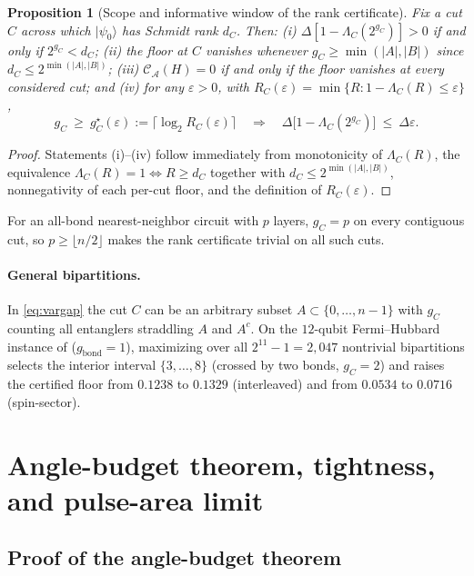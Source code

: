 \documentclass[reprint,aps,pra,floatfix,superscriptaddress,nofootinbib,longbibliography]{revtex4-2}
\newtheorem{proposition}[theorem]{Proposition}
\theoremstyle{remark}
\theoremstyle{definition}
\newcommand{\calA}{\mathcal{A}}
\newcommand{\calC}{\mathcal{C}}
\newcommand{\ket}[1]{\lvert #1 \rangle}
\begin{document}
\begin{proposition}[Scope and informative window of the rank certificate]
\label{prop:window}
Fix a cut $C$ across which $\ket{\psi_0}$ has Schmidt rank $d_C$. Then:
(i) $\Delta[1-\Lambda_C(2^{g_C})]>0$ if and only if $2^{g_C}<d_C$;
(ii) the floor at $C$ vanishes whenever $g_C\ge\min(|A|,|B|)$ since
$d_C\le2^{\min(|A|,|B|)}$;
(iii) $\calC_\calA(H)=0$ if and only if the floor vanishes at every considered
cut; and
(iv) for any $\varepsilon>0$, with $R_C(\varepsilon)=\min\{R:1-\Lambda_C(R)\le\varepsilon\}$,
\begin{equation}
  g_C\ \ge\ g_C^\star(\varepsilon):=\bigl\lceil\log_2 R_C(\varepsilon)\bigr\rceil
  \quad\Longrightarrow\quad
  \Delta\bigl[1-\Lambda_C(2^{g_C})\bigr]\ \le\ \Delta\varepsilon .
\end{equation}
\end{proposition}

\begin{proof}
Statements (i)--(iv) follow immediately from monotonicity of $\Lambda_C(R)$, the
equivalence $\Lambda_C(R)=1\iff R\ge d_C$ together with
$d_C\le2^{\min(|A|,|B|)}$, nonnegativity of each
per-cut floor, and the definition of $R_C(\varepsilon)$.
\end{proof}

For an all-bond nearest-neighbor circuit with $p$ layers, $g_C=p$ on every
contiguous cut, so $p\ge\lfloor n/2\rfloor$ makes the rank certificate trivial on
all such cuts.

\paragraph{General bipartitions.}
In \eqref{eq:vargap} the cut $C$ can be an arbitrary subset $A\subset\{0,\dots,n-1\}$
with $g_C$ counting all entanglers straddling $A$ and $A^c$. On the $12$-qubit
Fermi--Hubbard instance of  ($g_{\text{bond}}=1$), maximizing
over all $2^{11}-1=2{,}047$ nontrivial bipartitions selects the interior interval
$\{3,\dots,8\}$ (crossed by two bonds, $g_C=2$) and raises the certified floor
from $0.1238$ to $0.1329$ (interleaved) and from $0.0534$ to $0.0716$
(spin-sector).

\section{Angle-budget theorem, tightness, and pulse-area limit}
\label{app:angle}

\subsection{Proof of the angle-budget theorem}
\end{document}

